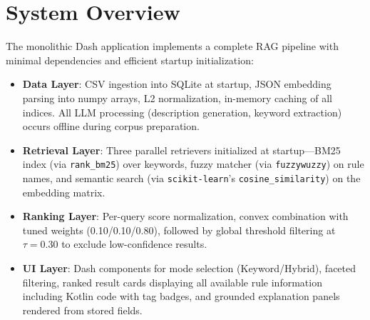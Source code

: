 \section{System Overview}
The monolithic Dash application implements a complete RAG pipeline with minimal dependencies and efficient startup initialization:

\begin{itemize}[leftmargin=*,itemsep=2pt,topsep=2pt]
\item \textbf{Data Layer}: CSV ingestion into SQLite at startup, JSON embedding parsing into numpy arrays, L2 normalization, in-memory caching of all indices. All LLM processing (description generation, keyword extraction) occurs offline during corpus preparation.
\item \textbf{Retrieval Layer}: Three parallel retrievers initialized at startup—BM25 index (via \texttt{rank\_bm25}) over keywords, fuzzy matcher (via \texttt{fuzzywuzzy}) on rule names, and semantic search (via \texttt{scikit-learn}'s \texttt{cosine\_similarity}) on the embedding matrix. 
\item \textbf{Ranking Layer}: Per-query score normalization, convex combination with tuned weights (0.10/0.10/0.80), followed by global threshold filtering at $\tau=0.30$ to exclude low-confidence results.
\item \textbf{UI Layer}: Dash components for mode selection (Keyword/Hybrid), faceted filtering, ranked result cards displaying all available rule information including Kotlin code with tag badges, and grounded explanation panels rendered from stored fields.
\end{itemize}

